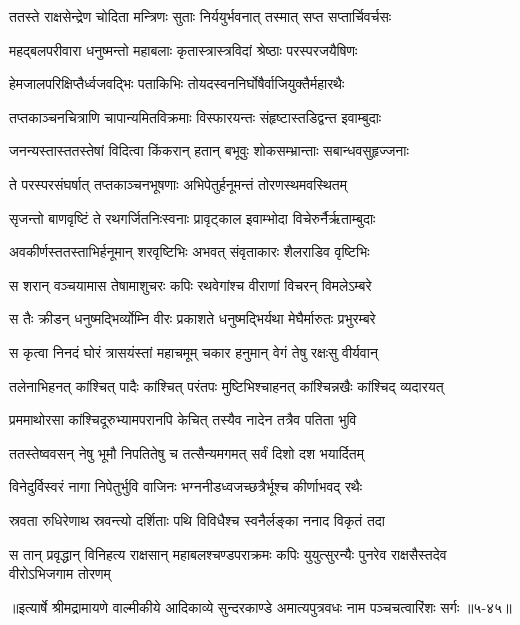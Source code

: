 
\twolineshloka
{ततस्ते राक्षसेन्द्रेण चोदिता मन्त्रिणः सुताः}
{निर्ययुर्भवनात् तस्मात् सप्त सप्तार्चिवर्चसः} %

\twolineshloka
{महद्बलपरीवारा धनुष्मन्तो महाबलाः}
{कृतास्त्रास्त्रविदां श्रेष्ठाः परस्परजयैषिणः} %

\twolineshloka
{हेमजालपरिक्षिप्तैर्ध्वजवद्भिः पताकिभिः}
{तोयदस्वननिर्घोषैर्वाजियुक्तैर्महारथैः} %

\twolineshloka
{तप्तकाञ्चनचित्राणि चापान्यमितविक्रमाः}
{विस्फारयन्तः संहृष्टास्तडिद्वन्त इवाम्बुदाः} %

\twolineshloka
{जनन्यस्तास्ततस्तेषां विदित्वा किंकरान् हतान्}
{बभूवुः शोकसम्भ्रान्ताः सबान्धवसुहृज्जनाः} %

\twolineshloka
{ते परस्परसंघर्षात् तप्तकाञ्चनभूषणाः}
{अभिपेतुर्हनूमन्तं तोरणस्थमवस्थितम्} %

\twolineshloka
{सृजन्तो बाणवृष्टिं ते रथगर्जितनिःस्वनाः}
{प्रावृट्काल इवाम्भोदा विचेरुर्नैर्ऋताम्बुदाः} %

\twolineshloka
{अवकीर्णस्ततस्ताभिर्हनूमान् शरवृष्टिभिः}
{अभवत् संवृताकारः शैलराडिव वृष्टिभिः} %

\twolineshloka
{स शरान् वञ्चयामास तेषामाशुचरः कपिः}
{रथवेगांश्च वीराणां विचरन् विमलेऽम्बरे} %

\twolineshloka
{स तैः क्रीडन् धनुष्मद्भिर्व्योम्नि वीरः प्रकाशते}
{धनुष्मद्भिर्यथा मेघैर्मारुतः प्रभुरम्बरे} %

\twolineshloka
{स कृत्वा निनदं घोरं त्रासयंस्तां महाचमूम्}
{चकार हनुमान् वेगं तेषु रक्षःसु वीर्यवान्} %

\twolineshloka
{तलेनाभिहनत् कांश्चित् पादैः कांश्चित् परंतपः}
{मुष्टिभिश्चाहनत् कांश्चिन्नखैः कांश्चिद् व्यदारयत्} %

\twolineshloka
{प्रममाथोरसा कांश्चिदूरुभ्यामपरानपि}
{केचित् तस्यैव नादेन तत्रैव पतिता भुवि} %

\twolineshloka
{ततस्तेष्ववसन् नेषु भूमौ निपतितेषु च}
{तत्सैन्यमगमत् सर्वं दिशो दश भयार्दितम्} %

\twolineshloka
{विनेदुर्विस्वरं नागा निपेतुर्भुवि वाजिनः}
{भग्ननीडध्वजच्छत्रैर्भूश्च कीर्णाभवद् रथैः} %

\twolineshloka
{स्रवता रुधिरेणाथ स्रवन्त्यो दर्शिताः पथि}
{विविधैश्च स्वनैर्लङ्का ननाद विकृतं तदा} %

\twolineshloka
{स तान् प्रवृद्धान् विनिहत्य राक्षसान् महाबलश्चण्डपराक्रमः कपिः}
{युयुत्सुरन्यैः पुनरेव राक्षसैस्तदेव वीरोऽभिजगाम तोरणम्} %


॥इत्यार्षे श्रीमद्रामायणे वाल्मीकीये आदिकाव्ये सुन्दरकाण्डे अमात्यपुत्रवधः नाम पञ्चचत्वारिंशः सर्गः ॥५-४५॥
